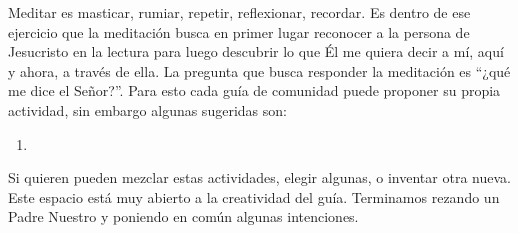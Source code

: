 Meditar es masticar, rumiar, repetir, reflexionar, recordar. Es dentro de ese ejercicio que la meditación busca en primer lugar reconocer a la persona de Jesucristo en la lectura para luego descubrir lo que Él me quiera decir a mí, aquí y ahora, a través de ella. La pregunta que busca responder la meditación es “¿qué me dice el Señor?”. Para esto cada guía de comunidad puede proponer su propia actividad, sin embargo algunas sugeridas son:

\begin{enumerate}
  \item 
\end{enumerate}
    
Si quieren pueden mezclar estas actividades, elegir algunas, o inventar otra nueva. Este espacio está muy abierto a la creatividad del guía.  
Terminamos rezando un Padre Nuestro y poniendo en común algunas intenciones.